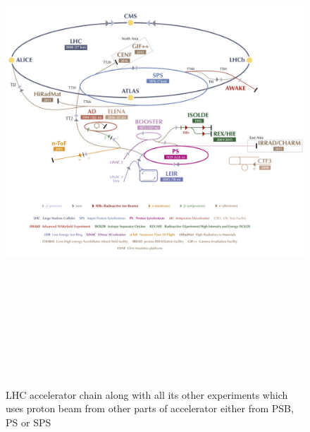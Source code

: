 \begin{figure}[!htbp]
	\centering
	\includegraphics[width=1.15\textwidth,height=19cm]{figures/LHC/CERN_Accelerator_Complex-v2016.jpg}
	\caption{LHC accelerator chain along with all its other experiments which uses proton beam from other parts of accelerator either from PSB, PS or SPS\cite{Fig-CERN-accelerator-complex}}
	\label{fig:CERN-accelerator-complex}
\end{figure}
